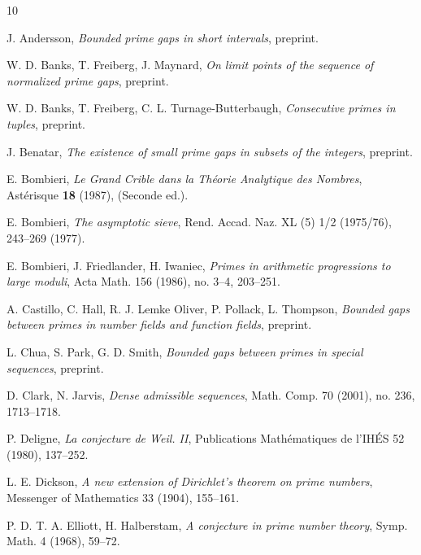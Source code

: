\documentclass{bmcart}
\theoremstyle{plain}
\theoremstyle{definition}
\begin{document}
\begin{backmatter}



\begin{thebibliography}{10}

J. Andersson, \emph{Bounded prime gaps in short intervals}, preprint.

W. D. Banks, T. Freiberg, J. Maynard, \emph{On limit points of the sequence of normalized prime gaps}, preprint.

W. D. Banks, T. Freiberg, C. L. Turnage-Butterbaugh, \emph{Consecutive primes in tuples}, preprint.

J. Benatar, \emph{The existence of small prime gaps in subsets of the integers}, preprint.

E. Bombieri, \emph{Le Grand Crible dans la Th\'eorie Analytique des Nombres}, Ast\'erisque \textbf{18} (1987), (Seconde ed.). 

E. Bombieri, \emph{The asymptotic sieve}, Rend. Accad. Naz. XL (5)
1/2 (1975/76), 243--269 (1977). 

 E. Bombieri, J. Friedlander, H. Iwaniec, \emph{Primes in
    arithmetic progressions to large moduli}, Acta Math. 156
  (1986), no. 3--4, 203--251.

A. Castillo, C. Hall, R. J. Lemke Oliver, P. Pollack, L. Thompson, \emph{Bounded gaps between primes in number fields and function fields}, preprint.

L. Chua, S. Park, G. D. Smith, \emph{Bounded gaps between primes in special sequences}, preprint.

D. Clark, N. Jarvis, \emph{Dense admissible sequences}, Math. Comp. 70 (2001), no. 236, 1713--1718.

P. Deligne, \emph{La conjecture de Weil. II}, Publications Math\'ematiques de l'IH\'ES 52 (1980), 137--252.

L. E. Dickson, \emph{A new extension of Dirichlet's theorem on prime numbers}, Messenger of Mathematics 33 (1904), 155--161.

 P. D. T. A. Elliott, H. Halberstam, \emph{A
    conjecture in prime number theory}, Symp. Math. 4 (1968), 59--72.


\end{thebibliography}
\end{backmatter}
\end{document}
